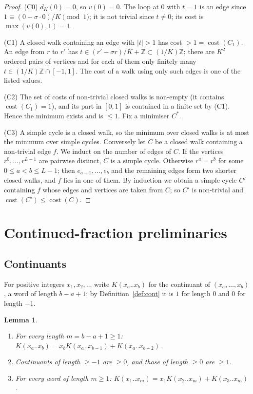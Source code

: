 \documentclass[11pt]{amsart}
\newtheorem{lemma}[theorem]{Lemma}
\theoremstyle{definition}
\theoremstyle{remark}
\newcommand{\Z}{\mathbb{Z}}
\newcommand{\cost}{\operatorname{cost}}
\begin{document}
\begin{proof}
(C0) $d_K(0)=0$, so $v(0)=0$. The loop at $0$ with $t=1$ is an edge since $1\equiv(0-\sigma\cdot0)/K\pmod1$;
it is not trivial since $t\ne0$; its cost is $\max(v(0),1)=1$.

(C1) A closed walk containing an edge with $|t|>1$ has cost $>1=\cost(C_1)$. An edge from $r$ to $r'$ has
$t\in(r'-\sigma r)/K+\Z\subset(1/K)\Z$; there are $K^2$ ordered pairs of vertices and for each of them only
finitely many $t\in(1/K)\Z\cap[-1,1]$. The cost of a walk using only such edges is one of the listed values.

(C2) The set of costs of non-trivial closed walks is non-empty (it contains $\cost(C_1)=1$), and its part
in $[0,1]$ is contained in a finite set by (C1). Hence the minimum exists and is $\le1$. Fix a minimiser
$C^*$.

(C3) A simple cycle is a closed walk, so the minimum over closed walks is at most the minimum over simple
cycles. Conversely let $C$ be a closed walk containing a non-trivial edge $f$. We induct on the number of
edges of $C$. If the vertices $r^0,\dots,r^{L-1}$ are pairwise distinct, $C$ is a simple cycle. Otherwise
$r^a=r^b$ for some $0\le a<b\le L-1$; then $e_{a+1},\dots,e_b$ and the remaining edges form two shorter
closed walks, and $f$ lies in one of them. By induction we obtain a simple cycle $C'$ containing $f$ whose
edges and vertices are taken from $C$; so $C'$ is non-trivial and $\cost(C')\le\cost(C)$.
\end{proof}

\section{Continued-fraction preliminaries}\label{sec:prelim}

\subsection{Continuants}
For positive integers $x_1,x_2,\dots$ write $K(x_a..x_b)$ for the continuant of $(x_a,\dots,x_b)$, a word of
length $b-a+1$; by Definition~\ref{def:cont} it is $1$ for length $0$ and $0$ for length $-1$.

\begin{lemma}\label{lem:cont}
\begin{enumerate}
\item[(RR)] For every length $m=b-a+1\ge1$: $K(x_a..x_b)=x_bK(x_a..x_{b-1})+K(x_a..x_{b-2})$.
\item[(N)] Continuants of length $\ge-1$ are $\ge0$, and those of length $\ge0$ are $\ge1$.
\item[(LL)] For every word of length $m\ge1$: $K(x_1..x_m)=x_1K(x_2..x_m)+K(x_3..x_m)$.
\end{enumerate}
\end{lemma}
\end{document}

